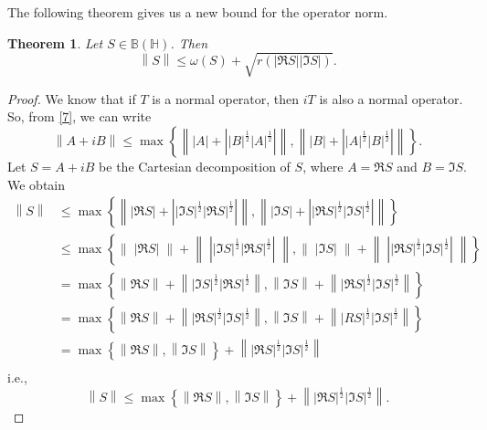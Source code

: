 \documentclass[12pt,twoside,reqno]{amsart}
\newtheorem{theorem}{Theorem}[section]
\numberwithin{equation}{section}
\begin{document}
The following theorem gives us a new bound for the operator norm.
\begin{theorem}\label{6}
Let $S\in \mathbb B\left( \mathbb H \right)$. Then
\[\left\| S \right\|\le \omega \left( S \right)+\sqrt{r\left( \left| \Re S \right|\left| \Im S \right| \right)}.\]
\end{theorem}
\begin{proof}
We know that if $T$ is a normal operator, then $iT$ is also a normal operator. So, from \eqref{7}, we can write
\[\left\| A+iB \right\|\le \max \left\{ \left\| \left| A \right|+\left| {{\left| B \right|}^{\frac{1}{2}}}{{\left| A \right|}^{\frac{1}{2}}} \right| \right\|,\left\| \left| B \right|+\left| {{\left| A \right|}^{\frac{1}{2}}}{{\left| B \right|}^{\frac{1}{2}}} \right| \right\| \right\}.\]
Let $S=A+iB$ be the Cartesian decomposition of $S$, where $A=\Re S$ and $B=\Im S$. We obtain
\[\begin{aligned}
   \left\| S \right\|&\le \max \left\{ \left\| \left| \Re S \right|+\left| {{\left| \Im S \right|}^{\frac{1}{2}}}{{\left| \Re S \right|}^{\frac{1}{2}}} \right| \right\|,\left\| \left| \Im S \right|+\left| {{\left| \Re S \right|}^{\frac{1}{2}}}{{\left| \Im S \right|}^{\frac{1}{2}}} \right| \right\| \right\} \\ 
 & \le \max \left\{ \left\| \;\left| \Re S \right| \;\right\|+\left\| \;\left| {{\left| \Im S \right|}^{\frac{1}{2}}}{{\left| \Re S \right|}^{\frac{1}{2}}} \right|\; \right\|,\left\| \;\left| \Im S \right| \;\right\|+\left\| \;\left| {{\left| \Re S \right|}^{\frac{1}{2}}}{{\left| \Im S \right|}^{\frac{1}{2}}} \right|\; \right\| \right\} \\ 
 & =\max \left\{ \left\| \Re S \right\|+\left\| {{\left| \Im S \right|}^{\frac{1}{2}}}{{\left| \Re S \right|}^{\frac{1}{2}}} \right\|,\left\| \Im S \right\|+\left\| {{\left| \Re S \right|}^{\frac{1}{2}}}{{\left| \Im S \right|}^{\frac{1}{2}}} \right\| \right\} \\ 
 & =\max \left\{ \left\| \Re S \right\|+\left\| {{\left| \Re S \right|}^{\frac{1}{2}}}{{\left| \Im S \right|}^{\frac{1}{2}}} \right\|,\left\| \Im S \right\|+\left\| {{\left| RS \right|}^{\frac{1}{2}}}{{\left| \Im S \right|}^{\frac{1}{2}}} \right\| \right\} \\ 
 & =\max \left\{ \left\| \Re S \right\|,\left\| \Im S \right\| \right\}+\left\| {{\left| \Re S \right|}^{\frac{1}{2}}}{{\left| \Im S \right|}^{\frac{1}{2}}} \right\| \\ 
 \end{aligned}\]
i.e.,
\[\left\| S \right\|\le \max \left\{ \left\| \Re S \right\|,\left\| \Im S \right\| \right\}+\left\| {{\left| \Re S \right|}^{\frac{1}{2}}}{{\left| \Im S \right|}^{\frac{1}{2}}} \right\|.\]

\end{proof}
\end{document}
